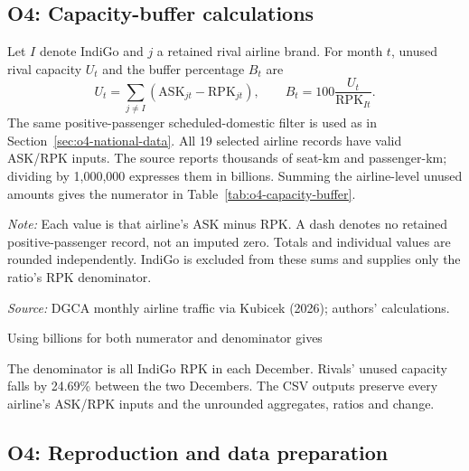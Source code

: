 \documentclass[12pt,a4paper]{article}
\begin{document}
\clearpage
\subsection{O4: Capacity-buffer calculations}
\label{app:o4-capacity-buffer}
Let $I$ denote IndiGo and $j$ a retained rival airline brand. For month $t$, unused rival capacity $U_t$ and the buffer percentage $B_t$ are
\[
U_t=\sum_{j\ne I}(\mathrm{ASK}_{jt}-\mathrm{RPK}_{jt}),
\qquad B_t=100\frac{U_t}{\mathrm{RPK}_{It}}.
\]
The same positive-passenger scheduled-domestic filter is used as in Section~\ref{sec:o4-national-data}. All 19 selected airline records have valid ASK/RPK inputs. The source reports thousands of seat-km and passenger-km; dividing by 1,000,000 expresses them in billions. Summing the airline-level unused amounts gives the numerator in Table~\ref{tab:o4-capacity-buffer}.

\begin{minipage}{\linewidth}
\captionsetup{font=small,labelfont=bf,justification=raggedright,singlelinecheck=false,hypcap=false}
\label{tab:o4-capacity-buffer-airlines}
\centering
{\small{}\par}
\vspace{4pt}
{\footnotesize{}\raggedright\textit{Note:} Each value is that airline's ASK minus RPK. A dash denotes no retained positive-passenger record, not an imputed zero. Totals and individual values are rounded independently. IndiGo is excluded from these sums and supplies only the ratio's RPK denominator.\par
\textit{Source:} DGCA monthly airline traffic via Kubicek (2026); authors' calculations.\par}
\end{minipage}

Using billions for both numerator and denominator gives

The denominator is all IndiGo RPK in each December. Rivals' unused capacity falls by 24.69\% between the two Decembers. The CSV outputs preserve every airline's ASK/RPK inputs and the unrounded aggregates, ratios and change.

\clearpage
\subsection{O4: Reproduction and data preparation}
\end{document}
